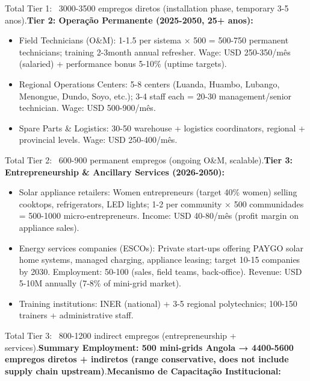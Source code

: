 \documentclass[12pt, a4paper]{article}
\begin{document}
Total Tier 1: ~3000-3500 empregos diretos (installation phase, temporary 3-5 anos).\textbf{Tier 2: Operação Permanente (2025-2050, 25+ anos):}
\begin{itemize}
\item Field Technicians (O\&M): 1-1.5 per sistema × 500 = 500-750 permanent technicians; training 2-3month annual refresher. Wage: USD 250-350/mês (salaried) + performance bonus 5-10\% (uptime targets).

\item Regional Operations Centers: 5-8 centers (Luanda, Huambo, Lubango, Menongue, Dundo, Soyo, etc.); 3-4 staff each = 20-30 management/senior technician. Wage: USD 500-900/mês.

\item Spare Parts \& Logistics: 30-50 warehouse + logistics coordinators, regional + provincial levels. Wage: USD 250-400/mês.
\end{itemize}

Total Tier 2: ~600-900 permanent empregos (ongoing O\&M, scalable).\textbf{Tier 3: Entrepreneurship \& Ancillary Services (2026-2050):}
\begin{itemize}
\item Solar appliance retailers: Women entrepreneurs (target 40\% women) selling cooktops, refrigerators, LED lights; 1-2 per community × 500 communidades = 500-1000 micro-entrepreneurs. Income: USD 40-80/mês (profit margin on appliance sales).

\item Energy services companies (ESCOs): Private start-ups offering PAYGO solar home systems, managed charging, appliance leasing; target 10-15 companies by 2030. Employment: 50-100 (sales, field teams, back-office). Revenue: USD 5-10M annually (7-8\% of mini-grid market).

\item Training institutions: INER (national) + 3-5 regional polytechnics; 100-150 trainers + administrative staff.
\end{itemize}

Total Tier 3: ~800-1200 indirect empregos (entrepreneurship + services).\textbf{Summary Employment: 500 mini-grids Angola → 4400-5600 empregos diretos + indiretos (range conservative, does not include supply chain upstream)}.\textbf{Mecanismo de Capacitação Institucional:}
\end{document}
